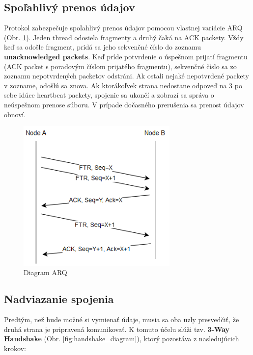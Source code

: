 \documentclass[a4paper,12pt]{article}
\begin{document}
    \subsection{Spoľahlivý prenos údajov}\label{prenos}
    Protokol zabezpečuje spoľahlivý prenos údajov pomocou vlastnej variácie ARQ (Obr. \ref{fig:arq_diagram}). Jeden thread odosiela fragmenty a druhý čaká na ACK packety. Vždy keď sa odošle fragment, pridá sa jeho sekvenčné číslo do zoznamu \textbf{unacknowledged packets}. Keď príde potvrdenie o úspešnom prijatí fragmentu (ACK packet s poradovým číslom prijatého fragmentu), sekvenčné číslo sa zo zoznamu nepotvrdených packetov odstráni. Ak ostali nejaké nepotvrdené packety v zozname, odošlú sa znova. Ak ktorákoľvek strana nedostane odpoveď na 3 po sebe idúce heartbeat packety, spojenie sa ukončí a zobrazí sa správa o neúspešnom prenose súboru. V prípade dočasného prerušenia sa prenost údajov obnoví.
	\begin{figure}[h]
		\centering
		\includegraphics[width=0.70\textwidth]{arq_diagram.png}
		\caption{Diagram ARQ}
		\label{fig:arq_diagram}
	\end{figure}

    \subsection{Nadviazanie spojenia}
	Predtým, než bude možné si vymienať údaje, musia sa oba uzly presvedčiť, že druhá strana je pripravená komunikovať. K tomuto účelu slúži tzv. \textbf{3-Way Handshake} (Obr. \ref{fig:handshake_diagram}), ktorý pozostáva z nasledujúcich krokov:
	
\end{document}
